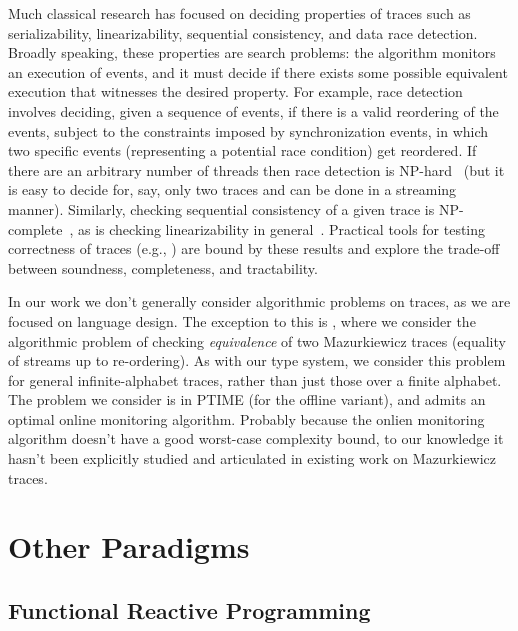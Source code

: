 Much classical research has focused on deciding properties of traces such as serializability, linearizability, sequential consistency, and data race detection.
Broadly speaking, these properties are search problems: the algorithm monitors an execution of events, and it must decide if there exists some possible equivalent execution that witnesses the desired property. For example, race detection involves deciding, given a sequence of events, if there is a valid reordering of the events, subject to the constraints imposed by synchronization events, in which two specific events (representing a potential race condition) get reordered. If there are an arbitrary number of threads then race detection is NP-hard~\cite{netzer1990complexity,netzer1992race}
(but it is easy to decide for, say, only two traces and can be done in a streaming manner).
Similarly, checking sequential consistency of a given trace is NP-complete~\cite{gibbons1992complexity},
as is checking linearizability in general~\cite{gibbons1997testing}.
Practical tools for testing correctness of traces (e.g., \cite{savage1997eraser,park2011efficient,sen2008race,wing1993testing,burckhardt2010line,lowe2017testing}) are bound by these results and explore the trade-off between soundness, completeness, and tractability.

In our work we don't generally consider algorithmic problems on traces,
as we are focused on language design.
The exception to this is ,
where we consider the algorithmic problem of checking \emph{equivalence} of two Mazurkiewicz traces (equality of streams up to re-ordering).
As with our type system, we consider this problem for general infinite-alphabet traces, rather than just those over a finite alphabet.
The problem we consider is in PTIME (for the offline variant), and admits an optimal online monitoring algorithm.
Probably because the onlien monitoring algorithm doesn't have a good worst-case complexity bound, to our knowledge it hasn't been explicitly studied and articulated in existing work on Mazurkiewicz traces.

\section{Other Paradigms}

\subsection{Functional Reactive Programming}

